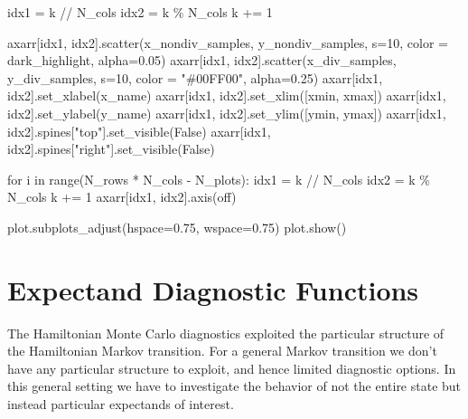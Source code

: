 \documentclass[
  letterpaper,
  DIV=11,
  numbers=noendperiod]{scrartcl}
\newenvironment{Shaded}{\begin{snugshade}}{\end{snugshade}}
\newcommand{\BuiltInTok}[1]{\textcolor[rgb]{0.00,0.23,0.31}{#1}}
\newcommand{\ControlFlowTok}[1]{\textcolor[rgb]{0.00,0.23,0.31}{#1}}
\newcommand{\DecValTok}[1]{\textcolor[rgb]{0.68,0.00,0.00}{#1}}
\newcommand{\FloatTok}[1]{\textcolor[rgb]{0.68,0.00,0.00}{#1}}
\newcommand{\KeywordTok}[1]{\textcolor[rgb]{0.00,0.23,0.31}{#1}}
\newcommand{\NormalTok}[1]{\textcolor[rgb]{0.00,0.23,0.31}{#1}}
\newcommand{\OperatorTok}[1]{\textcolor[rgb]{0.37,0.37,0.37}{#1}}
\newcommand{\StringTok}[1]{\textcolor[rgb]{0.13,0.47,0.30}{#1}}
\newcommand{\VariableTok}[1]{\textcolor[rgb]{0.07,0.07,0.07}{#1}}
\begin{document}
\begin{Shaded}
\begin{Highlighting}[]
\NormalTok{      idx1 }\OperatorTok{=}\NormalTok{ k }\OperatorTok{//}\NormalTok{ N\_cols}
\NormalTok{      idx2 }\OperatorTok{=}\NormalTok{ k }\OperatorTok{\%}\NormalTok{ N\_cols}
\NormalTok{      k }\OperatorTok{+=} \DecValTok{1}
          
\NormalTok{      axarr[idx1, idx2].scatter(x\_nondiv\_samples, y\_nondiv\_samples, s}\OperatorTok{=}\DecValTok{10}\NormalTok{,}
\NormalTok{                                color }\OperatorTok{=}\NormalTok{ dark\_highlight, alpha}\OperatorTok{=}\FloatTok{0.05}\NormalTok{)}
\NormalTok{      axarr[idx1, idx2].scatter(x\_div\_samples, y\_div\_samples, s}\OperatorTok{=}\DecValTok{10}\NormalTok{,}
\NormalTok{                                color }\OperatorTok{=} \StringTok{"\#00FF00"}\NormalTok{, alpha}\OperatorTok{=}\FloatTok{0.25}\NormalTok{)}
\NormalTok{      axarr[idx1, idx2].set\_xlabel(x\_name)}
\NormalTok{      axarr[idx1, idx2].set\_xlim([xmin, xmax])}
\NormalTok{      axarr[idx1, idx2].set\_ylabel(y\_name)}
\NormalTok{      axarr[idx1, idx2].set\_ylim([ymin, ymax])}
\NormalTok{      axarr[idx1, idx2].spines[}\StringTok{"top"}\NormalTok{].set\_visible(}\VariableTok{False}\NormalTok{)}
\NormalTok{      axarr[idx1, idx2].spines[}\StringTok{"right"}\NormalTok{].set\_visible(}\VariableTok{False}\NormalTok{)}
    
  \ControlFlowTok{for}\NormalTok{ i }\KeywordTok{in} \BuiltInTok{range}\NormalTok{(N\_rows }\OperatorTok{*}\NormalTok{ N\_cols }\OperatorTok{{-}}\NormalTok{ N\_plots):}
\NormalTok{    idx1 }\OperatorTok{=}\NormalTok{ k }\OperatorTok{//}\NormalTok{ N\_cols}
\NormalTok{    idx2 }\OperatorTok{=}\NormalTok{ k }\OperatorTok{\%}\NormalTok{ N\_cols}
\NormalTok{    k }\OperatorTok{+=} \DecValTok{1}
\NormalTok{    axarr[idx1, idx2].axis(}\StringTok{\textquotesingle{}off\textquotesingle{}}\NormalTok{)}
      
\NormalTok{  plot.subplots\_adjust(hspace}\OperatorTok{=}\FloatTok{0.75}\NormalTok{, wspace}\OperatorTok{=}\FloatTok{0.75}\NormalTok{)}
\NormalTok{  plot.show()}
\end{Highlighting}
\end{Shaded}

\hypertarget{expectand-diagnostic-functions}{%
\section{Expectand Diagnostic
Functions}\label{expectand-diagnostic-functions}}

The Hamiltonian Monte Carlo diagnostics exploited the particular
structure of the Hamiltonian Markov transition. For a general Markov
transition we don't have any particular structure to exploit, and hence
limited diagnostic options. In this general setting we have to
investigate the behavior of not the entire state but instead particular
expectands of interest.
\end{document}
